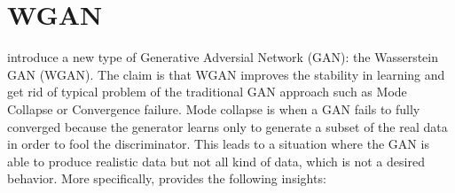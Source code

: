 \documentclass[11pt,a4paper,twoside]{report}
\begin{document}








\section{WGAN}

\cite{arjovsky2017wasserstein} introduce a new type of Generative Adversial Network (GAN): the Wasserstein GAN (WGAN). The claim is that WGAN improves the stability in learning and get rid of typical problem of the traditional GAN approach such as Mode Collapse or Convergence failure. Mode collapse is when a GAN fails to fully converged because the generator learns only to generate a subset of the real data in order to fool the discriminator. This leads to a situation where the GAN is able to produce realistic data but not all kind of data, which is not a desired behavior. More specifically, \cite{arjovsky2017wasserstein} provides the following insights:
\end{document}
